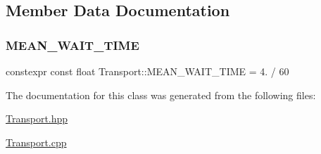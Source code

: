 \subsection{Member Data Documentation}
\hypertarget{class_transport_a40222f8cbeb3114a848c091bb9b78c61}{}\label{class_transport_a40222f8cbeb3114a848c091bb9b78c61} 
\subsubsection{\texorpdfstring{M\+E\+A\+N\+\_\+\+W\+A\+I\+T\+\_\+\+T\+I\+ME}{MEAN\_WAIT\_TIME}}
{\footnotesize\ttfamily constexpr const float Transport\+::\+M\+E\+A\+N\+\_\+\+W\+A\+I\+T\+\_\+\+T\+I\+ME = 4. / 60\hspace{0.3cm}{\ttfamily [static]}}



The documentation for this class was generated from the following files\+:\begin{DoxyCompactItemize}
\item 
\hyperlink{_transport_8hpp}{Transport.\+hpp}\item 
\hyperlink{_transport_8cpp}{Transport.\+cpp}\end{DoxyCompactItemize}

